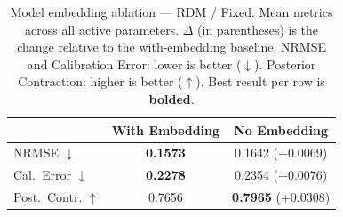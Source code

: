 \begin{table}[t]
\centering
\caption{Model embedding ablation — RDM / Fixed. Mean metrics across
all active parameters. $\Delta$ (in parentheses) is the change relative to the
with-embedding baseline. NRMSE and Calibration Error: lower is better ($\downarrow$).
Posterior Contraction: higher is better ($\uparrow$). Best result per row is
\textbf{bolded}.}
\label{tab:embed_ablation_rdm_fixed}
\begin{tabular}{lcc}
\toprule
 & With Embedding & No Embedding \\
\midrule
NRMSE $\downarrow$ & \textbf{0.1573} & 0.1642 \small{(+0.0069)} \\
Cal.\ Error $\downarrow$ & \textbf{0.2278} & 0.2354 \small{(+0.0076)} \\
Post.\ Contr. $\uparrow$ & 0.7656 & \textbf{0.7965} \small{(+0.0308)} \\
\bottomrule
\end{tabular}
\end{table}